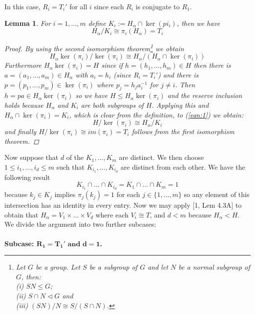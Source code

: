 \documentclass[]{article}
\newtheorem{lem}[thm]{Lemma}
\theoremstyle{definition}
\begin{document}
In this case, $R_i = T_i'$ for all $i$ since each $R_i$ is conjugate to $R_1$. 
\begin{lem}
	For $i=1,\dots,m$ define $K_i:= H_\alpha \cap \ker(pi_i)$, then we have
	\begin{equation*}
	H_\alpha / K_i \cong \pi_i(H_\alpha) = T_i
	\end{equation*}
\begin{proof}
	By using the second isomorphism theorem\footnote{Let $G$ be a group. Let $S$ be a subgroup of $G$ and let $N$ be a normal subgroup of $G$, then: \\ (i) $SN \leq G$;
		\\(ii) $S \cap N \vartriangleleft G$ and
		\\(iii) $(SN) / N \cong S / (S \cap N)$.} we obtain
	\begin{equation} \label{eqn:1}
		H_\alpha \ker(\pi_i) / \ker(\pi_i) \cong H_\alpha / (H_\alpha \cap \ker(\pi_i))
	\end{equation}
	Furthermore $H_\alpha \ker(\pi_i) = H$ since if $h=(h_1,\dots,h_m) \in H$ then there is $a=(a_1,\dots,a_m) \in H_\alpha$ with $a_i=h_i$ (since $R_i=T_i'$) and there is $p=(p_1,\dots,p_m) \in \ker(\pi_i)$ where $p_j=h_ja_i^{-1}$ for $j \neq i$. Then $h=pa \in H_\alpha \ker(\pi_i)$ so we have $H \leqslant H_\alpha \ker(\pi_i)$ and the reserve inclusion holds because $H_\alpha$ and $K_i$ are both subgroups of $H$. Applying this and $H_\alpha \cap \ker(\pi_i) =K_i$, which is clear from the definition, to (\ref{eqn:1}) we obtain:
	$$H / \ker(\pi_i) \cong H_\alpha / K_i $$
	and finally $H/\ker(\pi_i) \cong im(\pi_i)=T_i$ follows from the first isomorphism theorem. 
\end{proof}
\end{lem}

Now suppose that $d$ of the $K_1,\dots,K_m$ are distinct. We then choose $1\leq i_1,\dots,i_d \leq m$ such that $K_{i_1},\dots,K_{i_d}$ are distinct from each other. We have the following result
$$K_{i_1} \cap \dots \cap K_{i_d} = K_1 \cap \dots \cap K_m = 1$$
because $k_j \in K_j$ implies $\pi_j(k_j)=1$ for each $j \in \{1,\dots, m\}$ so any element of this intersection has an identity in every entry. Now we may apply [1, Lem 4.3A] to obtain that $H_\alpha = V_1 \times \dots \times V_d$ where each $V_i \cong T$, and $d < m $ because $H_\alpha < H$. We divide the argument into two further subcases:
\\
\\
\textbf{Subcase: $\mathbf{R_1=T_1' \mbox{ and } d=1}$.}
\\
\end{document}
